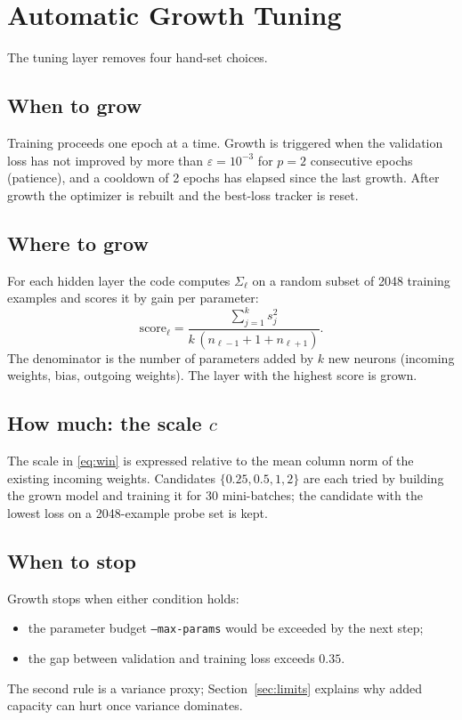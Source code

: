 \documentclass[11pt,a4paper]{article}
\newcommand{\code}[1]{\texttt{#1}}
\begin{document}
\section{Automatic Growth Tuning}
The tuning layer removes four hand-set choices.

\subsection{When to grow}
Training proceeds one epoch at a time. Growth is triggered when the validation loss has not improved by more than $\varepsilon=10^{-3}$ for $p=2$ consecutive epochs (patience), and a cooldown of 2 epochs has elapsed since the last growth. After growth the optimizer is rebuilt and the best-loss tracker is reset.

\subsection{Where to grow}
For each hidden layer the code computes $\Sigma_\ell$ on a random subset of 2048 training examples and scores it by gain per parameter:
\[
\mathrm{score}_\ell = \frac{\sum_{j=1}^{k}s_j^{2}}{k\,(n_{\ell-1} + 1 + n_{\ell+1})}.
\]
The denominator is the number of parameters added by $k$ new neurons (incoming weights, bias, outgoing weights). The layer with the highest score is grown.

\subsection{How much: the scale $c$}
The scale in \eqref{eq:win} is expressed relative to the mean column norm of the existing incoming weights. Candidates $\{0.25,0.5,1,2\}$ are each tried by building the grown model and training it for 30 mini-batches; the candidate with the lowest loss on a 2048-example probe set is kept.

\subsection{When to stop}
Growth stops when either condition holds:
\begin{itemize}[nosep]
  \item the parameter budget \code{--max-params} would be exceeded by the next step;
  \item the gap between validation and training loss exceeds $0.35$.
\end{itemize}
The second rule is a variance proxy; Section~\ref{sec:limits} explains why added capacity can hurt once variance dominates.
\end{document}
